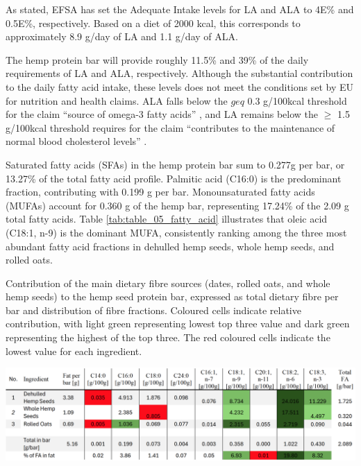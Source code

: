 \vspace{1em}
As stated, EFSA has set the Adequate Intake levels for LA and ALA to 4E\% and 0.5E\%, respectively. Based on a diet of 2000 kcal, this corresponds to approximately 8.9 g/day of LA and 1.1 g/day of ALA. 



\vspace{1em}
The hemp protein bar will provide roughly 11.5\% and 39\% of the daily requirements of LA and ALA, respectively. Although the substantial contribution to the daily fatty acid intake, these levels does not meet the conditions set by EU for nutrition and health claims. ALA falls below the $geq$ 0.3 g/100kcal threshold for the claim “source of omega-3 fatty acids” \cite*{art_23_regulation1162010}, and LA remains below the $\geq$ 1.5 g/100kcal threshold requires for the claim “contributes to the maintenance of normal blood cholesterol levels” \cite*{art_24_oat_kilning}.

\vspace{1em}
Saturated fatty acids (SFAs) in the hemp protein bar sum to 0.277g per bar, or 13.27\% of the total fatty acid profile. Palmitic acid (C16:0) is the predominant fraction, contributing with 0.199 g per bar. 
Monounsaturated fatty acids (MUFAs) account for 0.360 g of the hemp bar, representing 17.24\% of the 2.09 g total fatty acids. Table \ref*{tab:table_05_fatty_acid} illustrates that oleic acid (C18:1, n-9) is the dominant MUFA, consistently ranking among the three most abundant fatty acid fractions in dehulled hemp seeds, whole hemp seeds, and rolled oats. 


\begin{table}
    \centering
    \caption{Contribution of the main dietary fibre sources (dates, rolled oats, and whole hemp seeds) to the hemp seed protein bar,
    expressed as total dietary fibre per bar and distribution of fibre fractions. Coloured cells indicate relative contribution, with light
    green representing lowest top three value and dark green representing the highest of the top three. The red coloured cells indicate the
    lowest value for each ingredient.}
    \label{tab:table_05_fatty_acid}
    \includegraphics[angle=90,origin=c,width=0.22\textheight]{Figures/tab_fatty_01.png}
\end{table}

